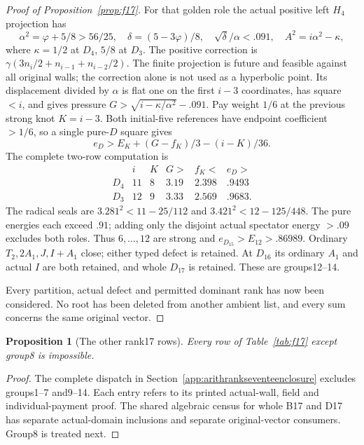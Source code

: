 \documentclass[11pt]{article}
\newtheorem{proposition}[theorem]{Proposition}
\begin{document}
\begin{proof}[Proof of Proposition~\ref{prop:f17}]
For that golden role the actual positive left $H_4$ projection has
\[
 \alpha^2=\varphi+5/8>56/25,\quad
 \delta=(5-3\varphi)/8,\quad \sqrt\delta/\alpha<.091,
 \quad A^2=i\alpha^2-\kappa,
\]
where $\kappa=1/2$ at $D_4$, $5/8$ at $D_3$.
The positive correction is
$\gamma(3n_i/2+n_{i-1}+n_{i-2}/2)$.
The finite projection is future and feasible against all original
walls; the correction alone is not used as a hyperbolic point.
Its displacement divided by $\alpha$ is flat one on the first
$i-3$ coordinates, has square $<i$, and gives pressure
$G>\sqrt{i-\kappa/\alpha^2}-.091$.
Pay weight $1/6$ at the previous strong knot $K=i-3$.
Both initial-five references have endpoint coefficient $>1/6$,
so a single pure-$D$ square gives
\[
 e_D>E_K+(G-f_K)/3-(i-K)/36.
\]
The complete two-row computation is
\[
\begin{array}{c|rrrr|c}
 &i&K&G>&f_K<&e_D>\\\hline
D_4&11&8&3.19&2.398&.9493\\
D_3&12&9&3.33&2.569&.9683.
\end{array}
\]
The radical seals are $3.281^2<11-25/112$ and
$3.421^2<12-125/448$. The pure energies each exceed $.91$;
adding only the disjoint actual spectator energy $>.09$ excludes
both roles. Thus $6,\ldots,12$ are strong and
$e_{D_{15}}>E_{12}>.86989$.
Ordinary $T_2,2A_1,J,I+A_1$ close; either typed defect is retained.
At $D_{16}$ its ordinary $A_1$ and actual $I$ are both retained,
and whole $D_{17}$ is retained. These are groups12--14.

Every partition, actual defect and permitted dominant rank has now
been considered. No root has been deleted from another ambient list,
and every sum concerns the same original vector.
\end{proof}

\begin{proposition}[The other rank17 rows]\label{prop:old17}
Every row of Table~\ref{tab:f17} except group8 is impossible.
\end{proposition}
\begin{proof}
The complete dispatch in Section~\ref{app:arithrankseventeenclosure}
excludes groups1--7 and9--14. Each entry refers to its printed actual-wall,
field and individual-payment proof. The shared algebraic census for
whole B17 and D17 has separate actual-domain inclusions and separate
original-vector consumers. Group8 is treated next.
\end{proof}
\end{document}
